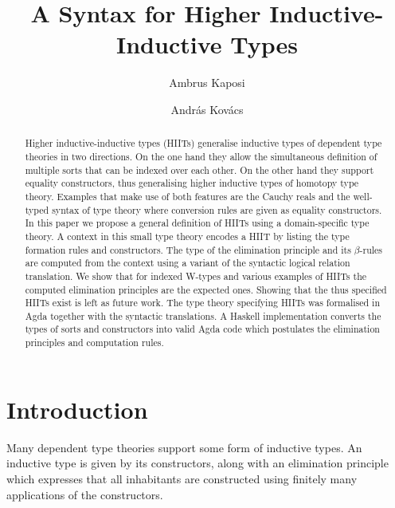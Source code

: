 \documentclass[a4paper,UKenglish]{lipics-v2018}
\title{A Syntax for Higher Inductive-Inductive Types}
\author{Ambrus Kaposi}{Faculty of Informatics, E{\"o}tv{\"o}s Lor{\'a}nd University, P{\'a}zm{\'a}ny P{\'e}ter s{\'e}t{\'a}ny 1/C, 1117 Budapest, Hungary}{akaposi@inf.elte.hu}{https://orcid.org/0000-0001-9897-8936}{}
\author{András Kovács}{Faculty of Informatics, E{\"o}tv{\"o}s Lor{\'a}nd University, P{\'a}zm{\'a}ny P{\'e}ter s{\'e}t{\'a}ny 1/C, 1117 Budapest, Hungary}{kovacsandras@inf.elte.hu}{https://orcid.org/0000-0002-6375-9781}{}
\newcommand{\1}{\mathsf{1}} \renewcommand{\Pr}{\mathsf{Pr}}
\begin{document}
\maketitle


\begin{abstract}
Higher inductive-inductive types (HIITs) generalise inductive types of
dependent type theories in two directions. On the one hand they allow
the simultaneous definition of multiple sorts that can be indexed over
each other. On the other hand they support equality constructors, thus
generalising higher inductive types of homotopy type theory. Examples
that make use of both features are the Cauchy reals and the well-typed
syntax of type theory where conversion rules are given as equality
constructors. In this paper we propose a general definition of HIITs
using a domain-specific type theory. A context in this small type
theory encodes a HIIT by listing the type formation rules and
constructors. The type of the elimination principle and its
$\beta$-rules are computed from the context using a variant of the
syntactic logical relation translation. We show that for indexed
W-types and various examples of HIITs the computed elimination
principles are the expected ones. Showing that the thus specified
HIITs exist is left as future work. The type theory specifying HIITs
was formalised in Agda together with the syntactic translations. A
Haskell implementation converts the types of sorts and constructors
into valid Agda code which postulates the elimination principles and
computation rules.
\end{abstract}


\section{Introduction}
\label{sec:intro}

Many dependent type theories support some form of inductive types. An
inductive type is given by its constructors, along with an elimination
principle which expresses that all inhabitants are constructed using
finitely many applications of the constructors.
\end{document}
